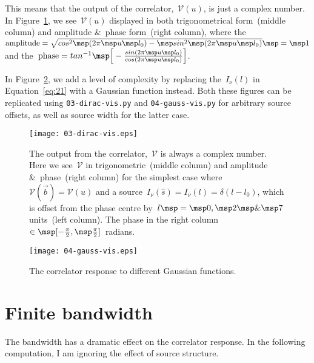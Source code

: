 This means that the output of the correlator,~$\mathcal{V}(u)$, is just a complex number. In Figure~\ref{fig:03-dirac-vis}, we see~$\mathcal{V}(u)$ displayed in both trigonometrical form~(middle column) and amplitude \&~phase form~(right column), where the~$\mbox{amplitude} = \sqrt{cos^2 \msp (2\pi \msp u \msp l_0) - \msp sin^2 \msp (2\pi \msp u \msp l_0)} \msp = \msp 1$ and the~$\mbox{phase} = tan^{-1} \msp \Big [-\frac{sin(2\pi \msp u \msp l_0)}{cos(2\pi \msp u \msp l_0)} \Big ]$.

In Figure~\ref{fig:04-gauss-vis}, we add a level of complexity by replacing the~$I_\nu (l)$ in Equation~\eqref{eq:21} with a Gaussian function instead. Both these figures can be replicated using \texttt{03-dirac-vis.py} and \texttt{04-gauss-vis.py} for arbitrary source offsets, as well as source width for the latter case.

\begin{figure}[]
  \centering
    \texttt{[image: 03-dirac-vis.eps]}
  \caption{The output from the correlator,~$\mathcal{V}$ is always a complex number. Here we see~$\mathcal{V}$ in trigonometric~(middle column) and amplitude \&~phase~(right column) for the simplest case where~$\mathcal{V}(\vec{b}) = \mathcal{V}(u)$ and a source~$I_\nu (\hat{s}) = I_\nu (l) = \delta(l - l_0)$, which is offset from the phase centre by~$l \msp = \msp 0, \msp 2 \msp \mbox{\&} \msp 7$ units~(left column). The phase in the right column~$\in \msp [-\frac{\pi }{2}, \msp \frac{\pi }{2}]$~radians.}
  \label{fig:03-dirac-vis}
\end{figure}

\begin{figure}
  \centering
    \texttt{[image: 04-gauss-vis.eps]}
  \caption{The correlator response to different Gaussian functions.}
  \label{fig:04-gauss-vis}
\end{figure}

\section{Finite bandwidth}

The bandwidth has a dramatic effect on the correlator response. In the following computation, I am ignoring the effect of source structure.

